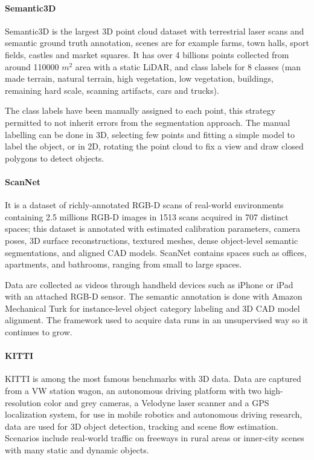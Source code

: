 \paragraph{Semantic3D~\cite{hackel2017semantic3dnet}}

Semantic3D is the largest 3D point cloud dataset with terrestrial laser scans and semantic ground truth annotation, scenes are for example farms, town halls, sport fields, castles and market squares. It has over 4 billions points  collected from around 110000 $m^2$ area with a static LiDAR, and class labels for 8 classes (man made terrain, natural terrain, high vegetation, low vegetation, buildings, remaining hard scale, scanning artifacts, cars and trucks).

The class labels have been manually assigned to each point, this strategy permitted to not inherit errors from the segmentation approach. The manual labelling can be done in 3D, selecting few points and fitting a simple model to label the object, or in 2D, rotating the point cloud to fix a view and draw closed polygons to detect objects.

\paragraph{ScanNet~\cite{dai2017scannet}}

It is a dataset of richly-annotated RGB-D scans of real-world environments containing 2.5 millions RGB-D images in 1513 scans acquired in 707 distinct spaces; this dataset is annotated with estimated calibration parameters, camera poses, 3D surface reconstructions, textured meshes, dense object-level semantic segmentations, and aligned CAD models. ScanNet contains spaces such as offices, apartments, and bathrooms, ranging from small to large spaces.

Data are collected as videos through handheld devices such as iPhone or iPad with an attached RGB-D sensor. The semantic annotation is done with Amazon Mechanical Turk for instance-level object category labeling and 3D CAD model alignment. The framework used to acquire data runs in an unsupervised way so it continues to grow.

\paragraph{KITTI~\cite{kitti}}

KITTI is among the most famous benchmarks with 3D data. Data are captured from a VW station wagon, an autonomous driving platform with two high-resolution color and grey cameras, a Velodyne laser scanner and a GPS localization system, for use in mobile robotics and autonomous driving research, data are used for 3D object detection, tracking and scene flow estimation. Scenarios include real-world traffic on freeways in rural areas or inner-city scenes with many static and dynamic objects.

